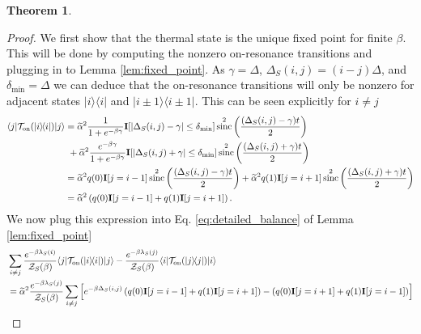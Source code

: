 \documentclass{article}
\newtheorem{theorem}{Theorem}
\newcommand{\on}{\rm on}
\newcommand{\ket}[1]{|#1\rangle}
\newcommand{\bra}[1]{\langle #1|}
\newcommand{\ketbra}[2]{| #1\rangle\! \langle #2|}
\newcommand{\norm}[1]{\left|\left| #1 \right|\right|}
\newcommand{\TT}{\mathcal{T}}
\newcommand{\bigotilde}[1]{\widetilde{O} \left( #1 \right)}
\newcommand{\partfun}{\mathcal{Z}}
\DeclareMathOperator{\sinc}{sinc}
\begin{document}
\begin{theorem}
    
    
\end{theorem}
\begin{proof}
    We first show that the thermal state is the unique fixed point for finite $\beta$. This will be done by computing the nonzero on-resonance transitions and plugging in to Lemma \ref{lem:fixed_point}. As $\gamma = \Delta$, $\Delta_S(i,j) = (i - j) \Delta$, and $\delta_{\min} = \Delta$ we can deduce that the on-resonance transitions will only be nonzero for adjacent states $\ketbra{i}{i}$ and $\ketbra{i \pm 1}{i \pm 1}$. This can be seen explicitly for $i \neq j$
    \begin{align}
        \bra{j} \TT_{\on}(\ketbra{i}{i}) \ket{j} &= \widetilde{\alpha}^2 \frac{1}{1 + e^{-\beta \gamma}} \mathbf{I}[|\Delta_S(i,j) - \gamma| \le \delta_{\min}]  \sinc^2\left(\frac{(\Delta_S(i,j) - \gamma)t}{2}\right) \nonumber \\
    &~+ \widetilde{\alpha}^2 \frac{e^{-\beta \gamma}}{1 + e^{-\beta \gamma}} \mathbf{I}[|\Delta_S(i,j) + \gamma| \le \delta_{\min}]  \sinc^2\left(\frac{(\Delta_S(i,j) + \gamma)t}{2}\right) \\
    &= \widetilde{\alpha}^2 q(0) \mathbf{I}[j = i - 1]  \sinc^2\left(\frac{(\Delta_S(i,j) - \gamma)t}{2}\right) + \widetilde{\alpha}^2 q(1) \mathbf{I}[j = i + 1]  \sinc^2\left(\frac{(\Delta_S(i,j) + \gamma)t}{2}\right) \\
    &= \widetilde{\alpha}^2 \left(q(0) \mathbf{I}[j = i - 1] +  q(1) \mathbf{I}[j = i + 1] \right). \label{eq:harmonic_oscillator_t_matrix}
    \end{align}
    We now plug this expression into Eq. \eqref{eq:detailed_balance} of Lemma \ref{lem:fixed_point}
    \begin{align}
        &\sum_{i \neq j} \frac{e^{-\beta \lambda_S(i)}}{\partfun_S(\beta)} \bra{j} \TT_{\on}(\ketbra{i}{i}) \ket{j} - \frac{e^{-\beta \lambda_S(j)}}{\partfun_S(\beta)} \bra{i} \TT_{\on}(\ketbra{j}{j}) \ket{i} \\
        &= \widetilde{\alpha}^2 \frac{e^{-\beta \lambda_S(j)}}{\partfun_S(\beta)} \sum_{i \neq j} \left[ e^{-\beta \Delta_S(i,j)} \left(q(0) \mathbf{I}[j = i - 1] +  q(1) \mathbf{I}[j = i + 1] \right) - \left(q(0) \mathbf{I}[j = i + 1] +  q(1) \mathbf{I}[j = i - 1] \right) \right] \\

\end{align}
\end{proof}
\end{document}
